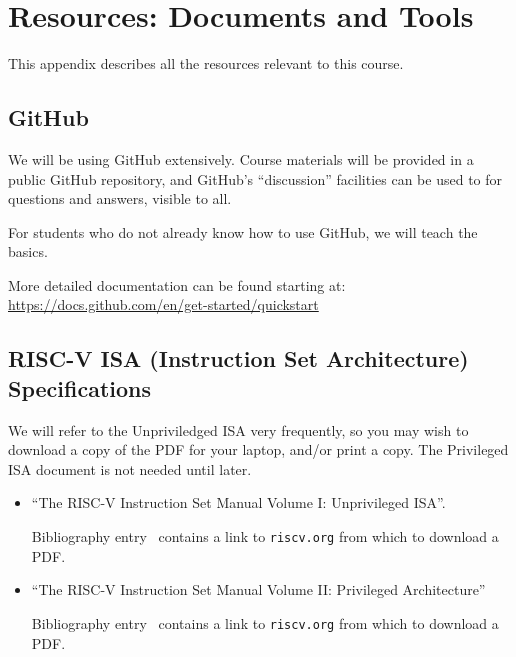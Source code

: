 

\chapter{Resources: Documents and Tools}


\setcounter{page}{1}
\renewcommand{\thepage}{\Alph{chapter}-\arabic{page}}

\label{apx_resources}


This appendix describes all the resources relevant to this course.


\section{GitHub}

We will be using GitHub extensively.  Course materials will be
provided in a public GitHub repository, and GitHub's ``discussion''
facilities can be used to for questions and answers, visible to all.

For students who do not already know how to use GitHub, we will teach
the basics.

More detailed documentation can be found starting at:
\url{https://docs.github.com/en/get-started/quickstart}


\section{RISC-V ISA (Instruction Set Architecture) Specifications}

\label{apx_resources_ISA_specs}

We will refer to the Unpriviledged ISA very frequently, so you may
wish to download a copy of the PDF for your laptop, and/or print a
copy.  The Privileged ISA document is not needed until later.

\begin{itemize}

\item ``The RISC-V Instruction Set Manual Volume I: Unprivileged ISA''.  

  Bibliography entry~\cite{RISCV_Unpriv_2019_12_13} contains a link
  to {\tt riscv.org} from which to download a PDF.

\item ``The RISC-V Instruction Set Manual Volume II: Privileged Architecture''

  Bibliography entry~\cite{RISCV_Priv_2021_12_03} contains a link
  to {\tt riscv.org} from which to download a PDF.

\end{itemize}

